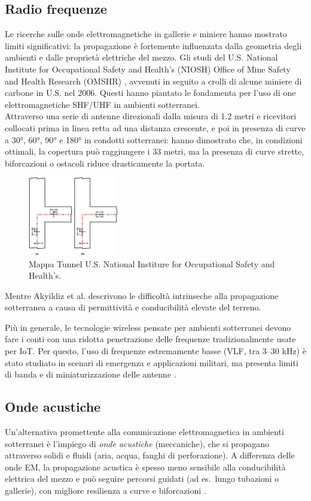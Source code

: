\subsection{Radio frequenze}
Le ricerche sulle onde elettromagnetiche in gallerie e miniere hanno mostrato
limiti significativi: la propagazione è fortemente influenzata dalla geometria degli
ambienti e dalle proprietà elettriche del mezzo.
Gli studi del U.S. National Institute for Occupational Safety and Health’s (NIOSH) Office of Mine Safety and Health Research (OMSHR)
\citep{jacksha2016}, avvenuti in seguito a crolli di alcune miniere di carbone
in U.S. nel 2006.
Questi hanno piantato le fondamenta per l'uso di one elettromagnetiche SHF/UHF in ambienti sotterranei.\\
Attraverso una serie di antenne direzionali dalla misura di 1.2 metri e ricevitori collocati prima in linea
retta ad una distanza crescente, e poi in presenza di curve a 30°, 60°, 90° e 180° in condotti sotterranei: 
hanno dimostrato che, in condizioni ottimali, la copertura può raggiungere i 33 metri, ma la presenza di curve strette, biforcazioni o ostacoli riduce drasticamente la portata\citep{jacksha2016}.
\begin{figure}[H]
    \centering
    \includegraphics[width=0.35\textwidth]{immagini/corner_em.jpg}
    \caption{Mappa Tunnel U.S. National Institure for Occupational Safety and Health's\citep{jacksha2016}.}
    \label{fig:esempio}
\end{figure}
Mentre
Akyildiz et al. \citep{akyildiz2006} descrivono le difficoltà intrinseche alla
propagazione sotterranea a causa di permittività e conducibilità elevate del terreno.

Più in generale, le tecnologie wireless pensate per ambienti sotterranei devono
fare i conti con una ridotta penetrazione delle frequenze tradizionalmente usate
per IoT. Per questo, l'uso di frequenze estremamente basse (VLF, tra 3–30 kHz)
è stato studiato in scenari di emergenza e applicazioni militari, ma presenta
limiti di banda e di miniaturizzazione delle antenne \citep{salam2023survey}.
\subsection{Onde acustiche}
Un'alternativa promettente alla comunicazione elettromagnetica in ambienti sotterranei è l'impiego di \emph{onde acustiche} (meccaniche), che si propagano attraverso solidi e fluidi (aria, acqua, fanghi di perforazione). A differenza delle onde EM, la propagazione acustica è spesso meno sensibile alla conducibilità elettrica del mezzo e può seguire percorsi guidati (ad es.\ lungo tubazioni o gallerie), con migliore resilienza a curve e biforcazioni \citep{fishta2023inpipe,heifetz2017pipes,farai2023mdpe}.

